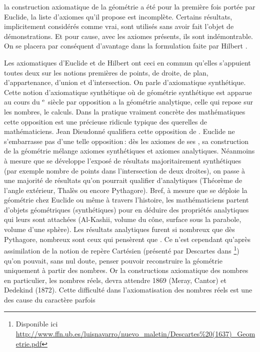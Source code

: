  la construction axiomatique de la géométrie a été pour la première fois portée par Euclide, la liste d'axiomes qu'il propose est incomplète. Certains résultats, implicitement considérés comme vrai, sont utilisés sans avoir fait l'objet de démonstrations. Et pour cause, avec les axiomes présents, ils sont indémontrable. On se placera par conséquent d'avantage dans la formulation faite par Hilbert \cite{HilbertLesPF}. 


Les axiomatiques d'Euclide et de Hilbert ont ceci en commun qu'elles s'appuient toutes deux sur les notions premières de points, de droite, de plan, d'appartenance, d'union et d'intersection. On parle d'axiomatique synthétique. Cette notion d'axiomatique synthétique où de géométrie synthétique est apparue au cours du  $^{\mathrm{e}}$ siècle par opposition a la géométrie analytique, celle qui repose sur les nombres, le calculs. Dans la pratique vraiment concrète des mathématiques cette opposition est une précieuse ridicule typique des querelles de mathématiciens. Jean Dieudonné qualifiera cette opposition de . Euclide \cite{euclidelements} ne s'embarrasse pas d'une telle opposition\,: dès les axiomes de ses , sa construction de la géométrie mélange axiomes synthétiques et axiomes analytiques. Néanmoins à mesure que se développe l'exposé de résultats majoritairement synthétiques (par exemple nombre de points dans l'intersection de deux droites), on passe à une majorité de résultats qu'on pourrait qualifier d'analytiques (Théorème de l'angle extérieur, Thalès ou encore Pythagore). Bref, à mesure que se déploie la géométrie chez Euclide ou même à travers l'histoire, les mathématiciens partent d'objets géométriques (synthétiques) pour en déduire des propriétés analytiques qui leurs sont attachées (Al-Kashii, volume du cône, surface sous la parabole, volume d'une sphère). Les résultats analytiques furent si nombreux que dès Pythagore, nombreux sont ceux qui pensèrent que . Ce n'est cependant qu'après assimilation de la notion de repère Cartésien (présenté par Descartes dans  \cite{descartesgeometrie} \footnote{Disponible ici \url{http://www.ffn.ub.es/luisnavarro/nuevo_maletin/Descartes\%20(1637)_Geometrie.pdf}}) qu'on pouvait, sans nul doute, penser pouvoir reconstruire la géométrie uniquement à partir des nombres. Or la constructions axiomatique des nombres en particulier, les nombres réels, devra attendre 1869 (Meray, Cantor) et Dedekind (1872). Cette difficulté dans l'axiomatisation des nombres réels est une des cause du caractère parfois 